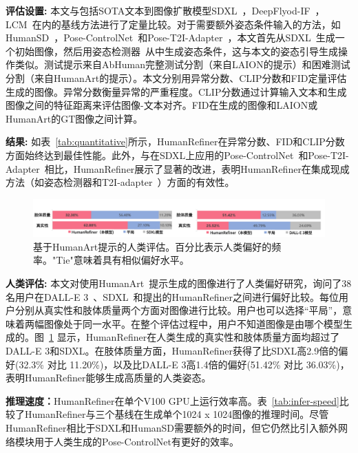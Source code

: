 \textbf{评估设置:} 本文与包括SOTA文本到图像扩散模型SDXL~\cite{SDXL}，DeepFlyod-IF~\cite{shonenkov2023deepfloyd}，LCM~\cite{luo2023latent}在内的基线方法进行了定量比较。对于需要额外姿态条件输入的方法，如HumanSD~\cite{ju2023humansd}，Pose-ControlNet~\cite{controlnet}和Pose-T2I-Adapter~\cite{t2i_adapter}，本文首先从SDXL~\cite{SDXL}生成一个初始图像，然后用姿态检测器~\cite{openpose}从中生成姿态条件，这与本文的姿态引导生成操作类似。测试提示来自AbHuman完整测试分割（来自LAION的提示）和困难测试分割（来自HumanArt的提示）。本文分别用异常分数、CLIP分数和FID定量评估生成的图像。异常分数衡量异常的严重程度。CLIP分数通过计算输入文本和生成图像之间的特征距离来评估图像-文本对齐。FID在生成的图像和LAION或HumanArt的GT图像之间计算。

\textbf{结果:} 如表~\ref{tab:quantitative}所示，HumanRefiner在异常分数、FID和CLIP分数方面始终达到最佳性能。此外，与在SDXL上应用的Pose-ControlNet~\cite{controlnet}和Pose-T2I-Adapter~\cite{t2i_adapter}相比，HumanRefiner展示了显著的改进，表明HumanRefiner在集成现成方法（如姿态检测器和T2I-adapter~\cite{t2i_adapter}）方面的有效性。

\label{sec:human-evaluation}
\begin{figure}[htb]
    \centering
    \includegraphics[width=1\columnwidth]{fig/human-evaluation1.pdf}
    \caption{基于HumanArt提示的人类评估。百分比表示人类偏好的频率。"Tie"意味着具有相似偏好水平。}
    \label{fig:human evaluation}
\end{figure}


\textbf{人类评估:} 本文对使用HumanArt~\cite{ju2023humanART}提示生成的图像进行了人类偏好研究，询问了38名用户在DALL-E 3~\cite{openai2023dalle3}、SDXL~\cite{SDXL}和提出的HumanRefiner之间进行偏好比较。每位用户分别从真实性和肢体质量两个方面对图像进行比较。用户也可以选择“平局”，意味着两幅图像处于同一水平。在整个评估过程中，用户不知道图像是由哪个模型生成的。图~\ref{fig:human evaluation} 显示，HumanRefiner在人类生成的真实性和肢体质量方面均超过了DALL-E 3和SDXL。在肢体质量方面，HumanRefiner获得了比SDXL高2.9倍的偏好(32.3\% 对比 11.20\%)，以及比DALL-E 3高1.4倍的偏好(51.42\% 对比 36.03\%)，表明HumanRefiner能够生成高质量的人类姿态。

\textbf{推理速度：}HumanRefiner在单个V100 GPU上运行效率高。表~\ref{tab:infer-speed}比较了HumanRefiner与三个基线在生成单个1024 x 1024图像的推理时间。尽管HumanRefiner相比于SDXL和HumanSD需要额外的时间，但它仍然比引入额外网络模块用于人类生成的Pose-ControlNet有更好的效率。

